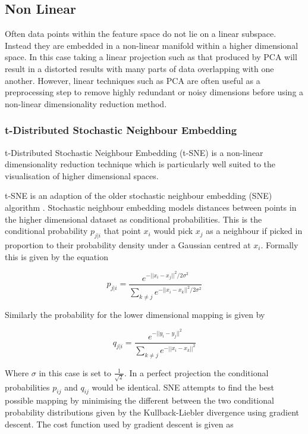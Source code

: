 \subsection{Non Linear}
Often data points within the feature space do not lie on a linear subspace. Instead they are embedded in a non-linear manifold within a higher dimensional space. In this case taking a linear projection such as that produced by PCA will result in a distorted results with many parts of data overlapping with one another. However, linear techniques such as PCA are often useful as a preprocessing step to remove highly redundant or noisy dimensions before using a non-linear dimensionality reduction method.

\subsubsection{t-Distributed Stochastic Neighbour Embedding}
t-Distributed Stochastic Neighbour Embedding (t-SNE) \cite{van2008visualizing} is a non-linear dimensionality reduction technique which is particularly well suited to the visualisation of higher dimensional spaces. 

t-SNE is an adaption of the older stochastic neighbour embedding (SNE) algorithm \cite{hinton2002stochastic}. Stochastic neighbour embedding models distances between points in the higher dimensional dataset as conditional probabilities. This is the conditional probability $p_{j|i}$ that point $x_i$ would pick $x_j$ as a neighbour if picked in proportion to their probability density under a Gaussian centred at $x_i$. Formally this is given by the equation

\begin{equation}
	p_{j|i} = \frac{e^{-||x_i - x_j ||^2 / 2\sigma^2}}{\sum_{k\neq j} e^{-||x_i - x_k ||^2 / 2\sigma^2}}
\end{equation}

Similarly the probability for the lower dimensional mapping is given by

\begin{equation}
	q_{j|i} = \frac{e^{-||y_i - y_j ||^2}}{\sum_{k\neq j} e^{-||x_i - x_k ||^2}}
\end{equation}

Where $\sigma$ in this case is set to $\frac{1}{\sqrt{2}}$. In a perfect projection the conditional probabilities $p_{ij}$ and $q_{ij}$ would be identical. SNE attempts to find the best possible mapping by minimising the different between the two conditional probability distributions given by the Kullback-Liebler divergence using gradient descent. The cost function used by gradient descent is given as

